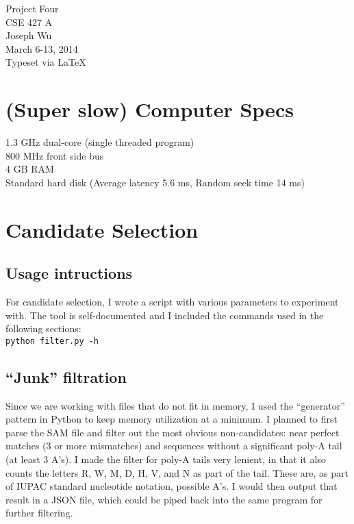 \documentclass[a4paper, 12pt]{report}
\begin{document}
    \begin{center}
        {\LARGE Project Four} \\
        CSE 427 A \\
        Joseph Wu  \\
        March 6-13, 2014 \\
        {\tiny Typeset via \LaTeX}
    \end{center}

\section{(Super slow) Computer Specs}
    1.3 GHz dual-core (single threaded program) \\
    800 MHz front side bus \\
    4 GB RAM \\
    Standard hard disk (Average latency 5.6 ms, Random seek time 14 ms)

\section{Candidate Selection}
    \subsection{Usage intructions}
    For candidate selection, I wrote a script with various parameters to experiment with.
    The tool is self-documented and I included the commands used in the following sections: \\
    \texttt{python filter.py -h}
    

    \subsection{``Junk'' filtration}
        Since we are working with files that do not fit in memory,
            I used the ``generator'' pattern in Python to keep memory utilization at a minimum.
        I planned to first parse the SAM file and filter out the most obvious non-candidates:
            near perfect matches (3 or more mismatches)
            and sequences without a significant poly-A tail (at least 3 A's).
        I made the filter for poly-A tails very lenient,
            in that it also counts the letters R, W, M, D, H, V, and N
            as part of the tail.
        These are, as part of IUPAC standard nucleotide notation, possible A's.
        I would then output that result in a JSON file,
            which could be piped back into the same program for further filtering.
\end{document}
